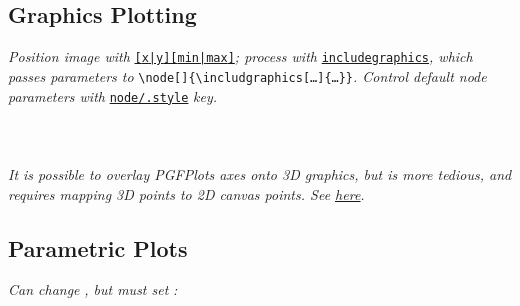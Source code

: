 \subsection*{Graphics Plotting}
\textit{Position image with }\href{\docurl\#pgfp./pgfplots/plot:graphics/xmin}{\texttt{[{\color{blue}x}|{\color{blue}y}][{\color{blue}min}|{\color{blue}max}]}}\textit{; process with }\href{\docurl\#pgfp./pgfplots/includegraphics}{\texttt{\color{blue}includegraphics}}\textit{, which passes parameters to }\texttt{\textbackslash node[]\{\textbackslash includgraphics[\dots]\{\dots\}\}}\textit{. Control default node parameters with }\href{\docurl\#pgfp./pgfplots/plot:graphics/node}{\texttt{\color{blue}node/.style}}\textit{ key.}\\
\\
\code{\phantom{xxx}[xmin=0,xmax=1,
ymin=0,ymax=1,}\\
\code{\phantom{xxx}includegraphics=\{trim=12 9 12 8,clip\}] }
\\
\textit{It is possible to overlay PGFPlots axes onto 3D graphics, but is more tedious, and requires mapping 3D points to 2D canvas points. See \underline{\href{https://tex.stackexchange.com/questions/52987/3-dimensional-histogram-in-pgfplots}{here}}.}


\subsection*{Parametric Plots}
\textit{Can change }\href{\docurl\#pgfp./pgfplots/variable}{}\textit{, but must set }\href{\docurl\#pgfp./pgfplots/domain}{}\textit{:}\\
\\
\\

